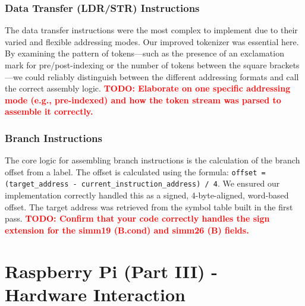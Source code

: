 \documentclass[11pt]{article}
\newcommand{\todo}[1]{\textcolor{red}{\textbf{TODO: #1}}}
\begin{document}
\subsubsection{Data Transfer (LDR/STR) Instructions}
The data transfer instructions were the most complex to implement due to their varied and flexible addressing modes. Our improved tokenizer was essential here. By examining the pattern of tokens---such as the presence of an exclamation mark for pre/post-indexing or the number of tokens between the square brackets---we could reliably distinguish between the different addressing formats and call the correct assembly logic.
\todo{Elaborate on one specific addressing mode (e.g., pre-indexed) and how the token stream was parsed to assemble it correctly.}

\subsubsection{Branch Instructions}
The core logic for assembling branch instructions is the calculation of the branch offset from a label. The offset is calculated using the formula: \texttt{offset = (target\_address - current\_instruction\_address) / 4}. We ensured our implementation correctly handled this as a signed, 4-byte-aligned, word-based offset. The target address was retrieved from the symbol table built in the first pass. 
\todo{Confirm that your code correctly handles the sign extension for the simm19 (B.cond) and simm26 (B) fields.}


\section{Raspberry Pi (Part III) - Hardware Interaction}
\end{document}
